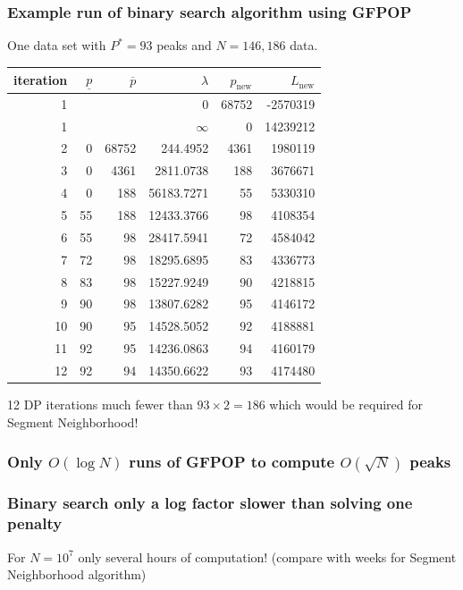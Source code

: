 \documentclass{beamer}
\begin{document}
\begin{frame}
  \frametitle{Example run of binary search algorithm using GFPOP}
  One data set with $P^*=93$ peaks and $N=146,186$ data.
  \begin{tabular}{rrrrrr}
 iteration& $\underline p$& $\overline p$&    $\lambda$ & $p_{\text{new}}$& $L_{\text{new}}$\\
\hline
         1&    &    &     0& 68752&   -2570319\\
         1&    &    &        $\infty$&     0&   14239212\\
         2&     0& 68752&   244.4952&  4361&    1980119\\
         3&     0&  4361&  2811.0738&   188&    3676671\\
         4&     0&   188& 56183.7271&    55&    5330310\\
         5&    55&   188& 12433.3766&    98&    4108354\\
         6&    55&    98& 28417.5941&    72&    4584042\\
         7&    72&    98& 18295.6895&    83&    4336773\\
         8&    83&    98& 15227.9249&    90&    4218815\\
         9&    90&    98& 13807.6282&    95&    4146172\\
        10&    90&    95& 14528.5052&    92&    4188881\\
        11&    92&    95& 14236.0863&    94&    4160179\\
        12&    92&    94& 14350.6622&    93&    4174480
  \end{tabular}

  \alert{12 DP iterations much fewer than $93\times 2=186$ which would be
  required for Segment Neighborhood!}
\end{frame}


\begin{frame}
  \frametitle{Only $O(\log N)$ runs of GFPOP to compute $O(\sqrt N)$
    peaks}
   
  
\end{frame}

\begin{frame}
  \frametitle{Binary search only a log factor slower than solving one penalty}
   

  For $N=10^7$ only several hours of computation! (compare with weeks
  for Segment Neighborhood algorithm)
  
\end{frame}
\end{document}
